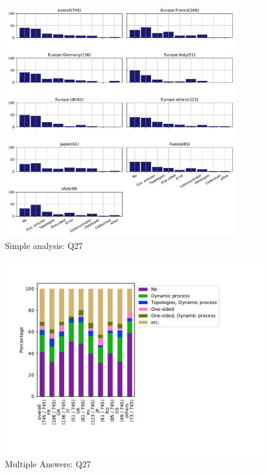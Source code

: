 \begin{figure}[htb]
\begin{center}
\includegraphics[width=10cm]{../pdfs/Q27.pdf}
\caption{Simple analysis: Q27}
\label{fig:Q27}
\end{center}
\end{figure}

\begin{figure}[htb]
\begin{center}
\includegraphics[width=14cm]{../pdfs/Q27-mans.pdf}
\caption{Multiple Answers: Q27}
\label{fig:Q27-mans}
\end{center}
\end{figure}
